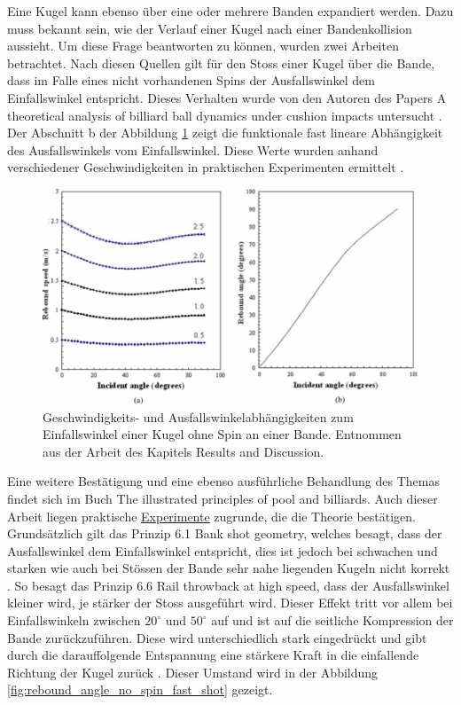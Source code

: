 Eine Kugel kann ebenso über eine oder mehrere Banden expandiert werden. Dazu muss bekannt sein, wie der Verlauf einer
Kugel nach einer Bandenkollision aussieht. Um diese Frage beantworten zu können, wurden zwei Arbeiten betrachtet.
Nach diesen Quellen gilt für den Stoss einer Kugel über die Bande, dass im Falle eines nicht vorhandenen Spins
der Ausfallswinkel dem Einfallswinkel entspricht. Dieses Verhalten wurde von den Autoren des Papers \glqq A theoretical analysis of billiard ball dynamics under cushion impacts\grqq{}
untersucht \cite{10.1243/09544062JMES1964}.
Der Abschnitt \glqq b\grqq{} der Abbildung \ref{fig:rail_rebound_angle_no_spin} zeigt die
funktionale fast lineare Abhängigkeit des Ausfallswinkels vom Einfallswinkel.
Diese Werte wurden anhand verschiedener Geschwindigkeiten in praktischen Experimenten ermittelt \cite{10.1243/09544062JMES1964}.

\begin{figure}[h!]
    \begin{center}
        \includegraphics[width=0.5\linewidth]{../common/03_billiard_ai/resources/55_rail_rebound_angle_no_spin.png}
    \end{center}
    \caption{Geschwindigkeits- und Ausfallswinkelabhängigkeiten zum Einfallswinkel einer Kugel ohne Spin an einer Bande.
    Entnommen aus der Arbeit \cite{10.1243/09544062JMES1964} des Kapitels \glqq Results and Discussion\grqq. }
    \label{fig:rail_rebound_angle_no_spin}
\end{figure}

Eine weitere Bestätigung und eine ebenso ausführliche Behandlung des Themas findet sich im Buch \glqq The illustrated principles
of pool and billiards\grqq. Auch dieser Arbeit liegen praktische
\href{https://billiards.colostate.edu/high-speed-video/}{Experimente} zugrunde, die die Theorie bestätigen.
Grundsätzlich gilt das Prinzip 6.1 \glqq Bank shot geometry\grqq, welches besagt, dass
der Ausfallswinkel dem Einfallswinkel entspricht, dies ist
jedoch bei schwachen und starken wie auch bei Stössen der Bande sehr nahe liegenden Kugeln nicht korrekt \cite{book:the_ilustrated_principles_of_pool_and_billiards}.
So besagt das Prinzip 6.6 \glqq Rail throwback at high speed\grqq, dass der Ausfallswinkel kleiner wird, je stärker der Stoss ausgeführt wird.
Dieser Effekt tritt vor allem bei Einfallswinkeln zwischen $20^{\circ}$ und $50^{\circ}$ auf und ist auf
die seitliche Kompression der Bande zurückzuführen. Diese wird unterschiedlich stark eingedrückt und gibt durch die
darauffolgende Entspannung eine stärkere Kraft in die einfallende Richtung der Kugel zurück \cite{book:the_ilustrated_principles_of_pool_and_billiards}.
Dieser Umstand wird in der Abbildung \ref{fig:rebound_angle_no_spin_fast_shot} gezeigt.

